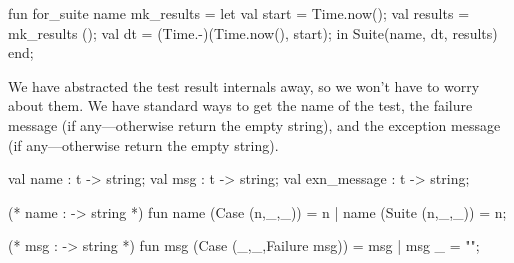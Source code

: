 \nwenddocs{}\plusendmoddef\nwstartdeflinemarkup{}\nwenddeflinemarkup
fun for_suite name mk_results =
  let
    val start = Time.now();
    val results = mk_results ();
    val dt = (Time.-)(Time.now(), start);
  in
    Suite(name, dt, results)
  end;
\eatline
{}\nwendcode{}\nwdocspar
\begin{node}
We have abstracted the test result internals away, so we won't have to
worry about them. We have standard ways to get the name of the test,
the failure message (if any---otherwise return the empty string), and
the exception message (if any---otherwise return the empty string).
\end{node}

\nwenddocs{}\plusendmoddef\nwstartdeflinemarkup{}\nwenddeflinemarkup
val name : t -> string;
val msg : t -> string;
val exn_message : t -> string;
\nwendcode{}\nwdocspar

\nwenddocs{}\plusendmoddef\nwstartdeflinemarkup{}\nwenddeflinemarkup
(* name :  -> string *)
fun name (Case (n,_,_)) = n
  | name (Suite (n,_,_)) = n;

(* msg :  -> string *)
fun msg (Case (_,_,Failure msg)) = msg
  | msg _ = "";

